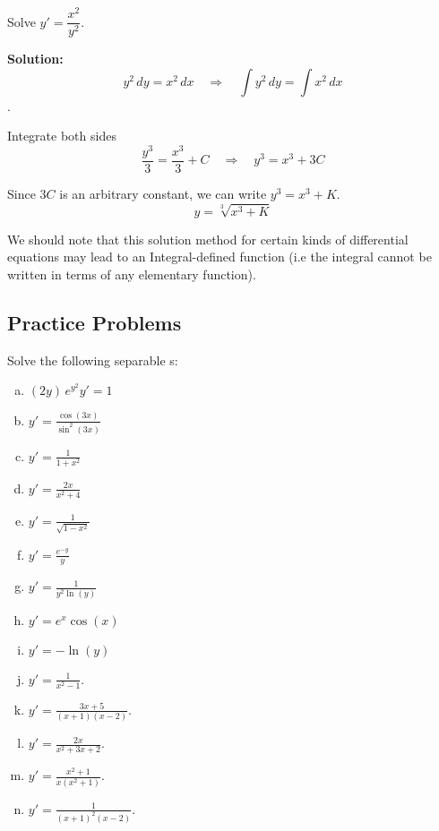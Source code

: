 \begin{example} Solve \(y' = \dfrac{x^2}{y^2}\).

    \textbf{Solution:}
    \[
    y^2 \, dy = x^2 \, dx \quad \Rightarrow \quad \int y^2 \, dy = \int x^2 \, dx
    \].
    
    Integrate both sides
    \[
    \frac{y^3}{3} = \frac{x^3}{3} + C \quad \Rightarrow \quad y^3 = x^3 + 3C
    \] 
    
    Since $3C$ is an arbitrary constant, we can write $y^3 = x^3 + K$.
    $$ y = \sqrt[3]{x^3 + K} $$

\end{example}


\begin{highlight}
    We should note that this solution method for certain kinds of differential
    equations may lead to an Integral-defined function (i.e the integral cannot 
    be written in terms of any elementary function).
\end{highlight}


\subsection*{Practice Problems}
\begin{question}
  Solve the following separable \ode{}s:
  \begin{multicols}{3}
  \begin{enumerate}[a)]
    \item $\displaystyle (2y)\, e^{y^2}y' = 1$
    \item $\displaystyle y' =\frac{\cos(3x)}{\sin^2(3x)}$
    \item $\displaystyle y' = \frac{1}{1+x^2}$
    \item $\displaystyle y' = \frac{2x}{x^2+4}$
    \item $\displaystyle y' = \frac{1}{\sqrt{1-x^2}}$
    \item $\displaystyle y' = \frac{e^{-y}}{y}$
    \item $\displaystyle y' = \frac{1}{y^2 \ln(y)}$
    \item $\displaystyle y' = e^x \cos(x)$
    \item $\displaystyle y' = -\ln(y)$
    \item $\displaystyle y' = \frac{1}{x^2-1}$.
    \item $\displaystyle y' = \frac{3x+5}{(x+1)(x-2)}$.
    \item $\displaystyle y' = \frac{2x}{x^2+3x+2}$.
    \item $\displaystyle y' = \frac{x^2+1}{x(x^2+1)}$.
    \item $\displaystyle y' = \frac{1}{(x+1)^2(x-2)}$.
\end{enumerate}
\end{multicols}
\end{question}

